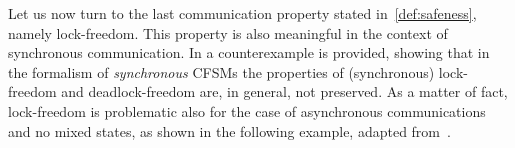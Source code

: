 
\medskip
Let us now turn to the last communication property stated in~\cref{def:safeness},
namely lock-freedom. This property is also meaningful in the context of synchronous
communication.
In \cite[Example 6.7]{BLT23}
a counterexample is provided, showing that in the formalism of {\em synchronous} CFSMs the properties of (synchronous) lock-freedom and deadlock-freedom
are, in general, not preserved.
As a matter of fact, lock-freedom is problematic also for the case of asynchronous communications and no mixed states,
as shown in the following example,
adapted from~\cite{BLT23}.%


